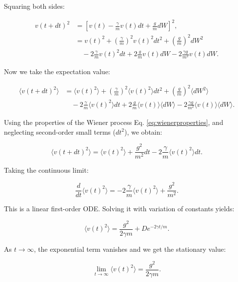 Squaring both sides:

\begin{align}
  v(t + dt)^2 &= \left[ v(t) - \frac{\gamma}{m} v(t) dt + \frac{g}{m} dW \right]^2 \text{,}\\
              &= v(t)^2 + \left( \frac{\gamma}{m} \right)^2 v(t)^2 dt^2 + \left( \frac{g}{m} \right)^2 dW^2 \nonumber \\
              &\quad - 2 \frac{\gamma}{m} v(t)^2 dt + 2 \frac{g}{m} v(t) dW - 2 \frac{\gamma g}{m^2} v(t) dW \text{.}
\end{align}

Now we take the expectation value:

\begin{align}
  \langle v(t + dt)^2 \rangle &= \langle v(t)^2 \rangle + \left( \frac{\gamma}{m} \right)^2 \langle v(t)^2 \rangle dt^2 + \left( \frac{g}{m} \right)^2 \langle dW^2 \rangle \nonumber \\
                              &\quad - 2 \frac{\gamma}{m} \langle v(t)^2 \rangle dt + 2 \frac{g}{m} \langle v(t) \rangle \langle dW \rangle - 2 \frac{\gamma g}{m^2} \langle v(t) \rangle \langle dW \rangle \text{.}
\end{align}

Using the properties of the Wiener process Eq. \ref{eq:wienerproperties}, and neglecting second-order small terms (\( dt^2 \)), we obtain:

\begin{equation}
  \langle v(t + dt)^2 \rangle = \langle v(t)^2 \rangle + \frac{g^2}{m^2} dt - 2 \frac{\gamma}{m} \langle v(t)^2 \rangle dt \text{.}
\end{equation}

Taking the continuous limit:

\begin{equation}
  \frac{d}{dt} \langle v(t)^2 \rangle = -2 \frac{\gamma}{m} \langle v(t)^2 \rangle + \frac{g^2}{m^2} \text{.}
\end{equation}

This is a linear first-order ODE. Solving it with variation of constants yields:

\begin{equation}
  \langle v(t)^2 \rangle = \frac{g^2}{2 \gamma m} + D e^{-2 \gamma t / m} \text{.}
\end{equation}

As \( t \to \infty \), the exponential term vanishes and we get the stationary value:

\begin{equation}
   \lim _{t \to \infty} \langle v(t)^2 \rangle = \frac{g^2}{2 \gamma m} \text{.}
\end{equation}

